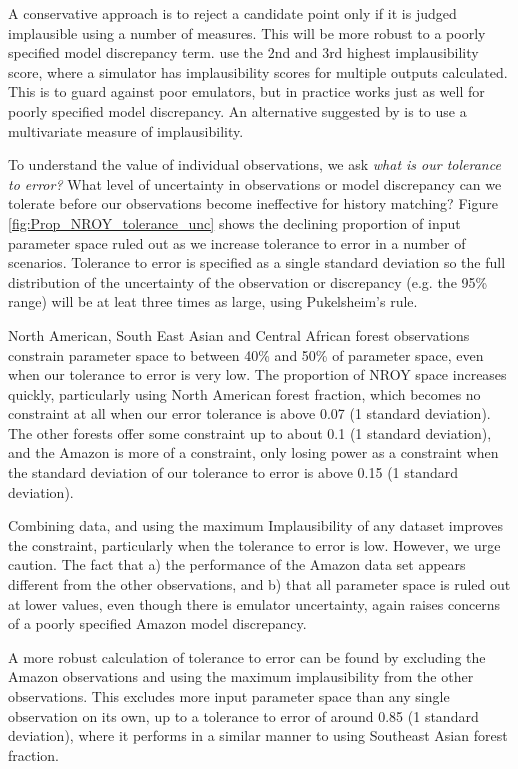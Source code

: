 \documentclass[esd, article]{copernicus} %
\begin{document}
A conservative approach is to reject a candidate point only if it is judged implausible using a number of measures. This will be more robust to a poorly specified model discrepancy term. \cite{vernon2010galaxy} use the 2nd and 3rd highest implausibility score, where a simulator has implausibility scores for multiple outputs calculated. This is to guard against poor emulators, but in practice works just as well for poorly specified model discrepancy. An alternative suggested by \cite{vernon2010galaxy} is to use a multivariate measure of implausibility.

To understand the value of individual observations, we ask \emph{what is our tolerance to error?} What level of uncertainty in observations or model discrepancy  can we tolerate before our observations become ineffective for history matching? Figure \ref{fig:Prop_NROY_tolerance_unc} shows the declining proportion of input parameter space ruled out as we increase tolerance to error in a number of scenarios. Tolerance to error is specified as a single standard deviation so the full distribution of the uncertainty of the observation or discrepancy (e.g. the 95\% range) will be at leat three times as large, using Pukelsheim's rule.

North American, South East Asian and Central African forest observations constrain parameter space to between 40\% and 50\% of parameter space, even when our tolerance to error is very low. The proportion of NROY space increases quickly, particularly using North American forest fraction, which becomes no constraint at all when our error tolerance is above 0.07 (1 standard deviation). The other forests offer some constraint up to about 0.1 (1 standard deviation), and the Amazon is more of a constraint, only losing power as a constraint when the standard deviation of our tolerance to error is above 0.15 (1 standard deviation).

Combining data, and using the maximum Implausibility of any dataset improves the constraint, particularly when the tolerance to error is low. However, we urge caution. The fact that a) the performance of the Amazon data set appears different from the other observations, and b) that all parameter space is ruled out at lower values, even though there is emulator uncertainty, again raises concerns of a poorly specified Amazon model discrepancy. 

A more robust calculation of tolerance to error can be found by excluding the Amazon observations and using the maximum implausibility from the other observations. This excludes more input parameter space than any single observation on its own, up to a tolerance to error of around 0.85 (1 standard deviation), where it performs in a similar manner to using Southeast Asian forest fraction.
 
\end{document}
